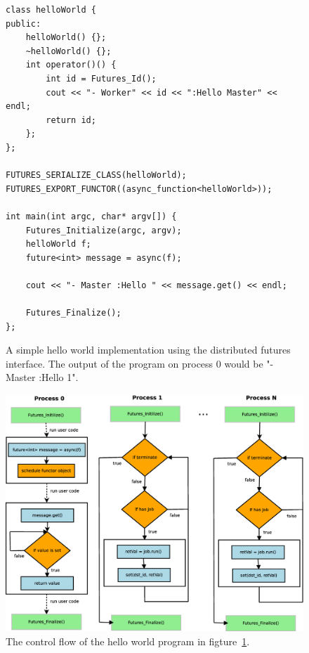 \begin{figure}[here]
\begin{lstlisting}
class helloWorld {
public:
	helloWorld() {};
	~helloWorld() {};
	int operator()() { 
		int id = Futures_Id();
		cout << "- Worker" << id << ":Hello Master" << endl;
		return id;
	};
};

FUTURES_SERIALIZE_CLASS(helloWorld);
FUTURES_EXPORT_FUNCTOR((async_function<helloWorld>));

int main(int argc, char* argv[]) {
	Futures_Initialize(argc, argv);
	helloWorld f;
	future<int> message = async(f);

	cout << "- Master :Hello " << message.get() << endl;

	Futures_Finalize();
};
\end{lstlisting}
\caption{
A simple hello world implementation using the distributed futures interface.  
The output of the program on process 0 would be "- Master :Hello 1".}
\label{lst:hello}
\end{figure}

\begin{figure}[here]
\includegraphics[width=\columnwidth]{figures/hello_flow}
\caption{
The control flow of the hello world program in figture~\ref{lst:hello}.}
\label{fig:helloCF}
\end{figure}

